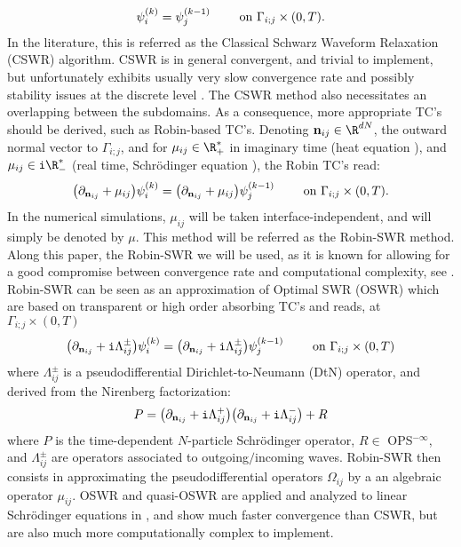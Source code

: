 \begin{eqnarray*}
\psi^{(k)}_i = \psi^{(k-1)}_j \qquad \hbox{ on } \Gamma_{i;j}\times(0,T).
\end{eqnarray*}
In the literature, this is referred as the Classical Schwarz Waveform Relaxation (CSWR) algorithm. CSWR is in general convergent, and trivial to implement, but unfortunately exhibits usually very slow convergence rate and possibly stability issues at the discrete level \cite{halpern2,halpern3,jsc}. The CSWR method also necessitates an overlapping between the subdomains. As a consequence, more appropriate TC's should be derived, such as Robin-based TC's. Denoting ${\bf n}_{ij} \in \R^{dN}$, the outward normal vector to $\Gamma_{i;j}$, and for $\mu_{ij} \in \R_+^*$ in imaginary time (heat equation \cite{halpern3}), and $\mu_{ij} \in {\tt i}\R_{-}^*$ (real time, Schr\"odinger equation \cite{halpern2}), the Robin TC's read:
\begin{eqnarray}\label{RTC}
\big(\partial_{{\bf n}_{ij}}+\mu_{ij}\big)\psi^{(k)}_i = \big(\partial_{{\bf n}_{ij}}+\mu_{ij}\big)\psi^{(k-1)}_j \qquad \hbox{ on } \Gamma_{i;j}\times(0,T).
\end{eqnarray}
In the numerical simulations, $\mu_{ij}$ will be taken interface-independent, and will simply be denoted by $\mu$. This method will be referred as the Robin-SWR method. Along this paper, the Robin-SWR we will be used, as it is known for allowing for a good compromise between convergence rate and computational complexity, see \cite{halpern2}. Robin-SWR can be seen as an approximation of Optimal SWR (OSWR) which are based on transparent or high order absorbing TC's and reads, at $\Gamma_{i;j}\times(0,T)$
\begin{eqnarray*}
\big(\partial_{{\bf n}_{ij}}+{\tt i}\Lambda^{\pm}_{ij}\big)\psi^{(k)}_i = \big(\partial_{{\bf n}_{ij}}+{\tt i}\Lambda^{\pm}_{ij}\big)\psi^{(k-1)}_j \qquad \hbox{ on } \Gamma_{i;j}\times(0,T)
\end{eqnarray*}
where $\Lambda^{\pm}_{ij}$ is a pseudodifferential Dirichlet-to-Neumann (DtN) operator, \cite{nir,hor1,hor2} and derived from the Nirenberg factorization: 
\begin{eqnarray*}
P = \big(\partial_{{\bf n}_{ij}}+{\tt i}\Lambda^{+}_{ij}\big)\big(\partial_{{\bf n}_{ij}}+{\tt i}\Lambda^{-}_{ij}\big) + R
\end{eqnarray*}
where $P$ is the time-dependent $N$-particle Schr\"odinger operator, $R\in$ OPS$^{-\infty}$, and $\Lambda^{\pm}_{ij}$ are operators associated to outgoing$/$incoming waves.  Robin-SWR then consists in approximating the pseudodifferential operators $\Omega_{ij}$ by a an algebraic operator $\mu_{ij}$. OSWR and quasi-OSWR are applied and analyzed to linear Schr\"odinger equations in \cite{halpern2,jsc}, and show much faster convergence than CSWR, but are also much more computationally complex to implement.
